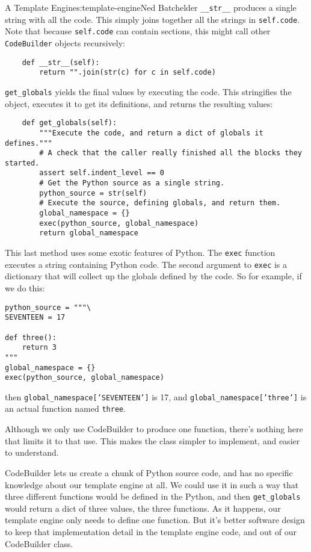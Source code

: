 \begin{aosachapter}{A Template Engine}{s:template-engine}{Ned Batchelder}
\texttt{\_\_str\_\_} produces a single string with all the code. This
simply joins together all the strings in \texttt{self.code}. Note that
because \texttt{self.code} can contain sections, this might call other
\texttt{CodeBuilder} objects recursively:

\begin{verbatim}
    def __str__(self):
        return "".join(str(c) for c in self.code)
\end{verbatim}

\texttt{get\_globals} yields the final values by executing the code.
This stringifies the object, executes it to get its definitions, and
returns the resulting values:

\begin{verbatim}
    def get_globals(self):
        """Execute the code, and return a dict of globals it defines."""
        # A check that the caller really finished all the blocks they started.
        assert self.indent_level == 0
        # Get the Python source as a single string.
        python_source = str(self)
        # Execute the source, defining globals, and return them.
        global_namespace = {}
        exec(python_source, global_namespace)
        return global_namespace
\end{verbatim}

This last method uses some exotic features of Python. The \texttt{exec}
function executes a string containing Python code. The second argument
to \texttt{exec} is a dictionary that will collect up the globals
defined by the code. So for example, if we do this:

\begin{verbatim}
python_source = """\
SEVENTEEN = 17

def three():
    return 3
"""
global_namespace = {}
exec(python_source, global_namespace)
\end{verbatim}

then \texttt{global\_namespace{[}'SEVENTEEN'{]}} is 17, and
\texttt{global\_namespace{[}'three'{]}} is an actual function named
\texttt{three}.

Although we only use CodeBuilder to produce one function, there's
nothing here that limits it to that use. This makes the class simpler to
implement, and easier to understand.

CodeBuilder lets us create a chunk of Python source code, and has no
specific knowledge about our template engine at all. We could use it in
such a way that three different functions would be defined in the
Python, and then \texttt{get\_globals} would return a dict of three
values, the three functions. As it happens, our template engine only
needs to define one function. But it's better software design to keep
that implementation detail in the template engine code, and out of our
CodeBuilder class.


\end{aosachapter}
